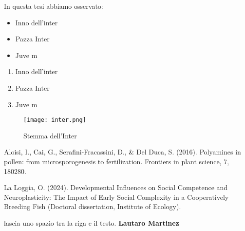\documentclass[12pt]{article} %
\begin{document}
In questa tesi abbiamo osservato:
\begin{itemize} %
    \item Inno dell'inter
    \item Pazza Inter
    \item Juve m
\end{itemize} %

\begin{enumerate} %
    \item Inno dell'inter
    \item Pazza Inter
    \item Juve m
\end{enumerate}

\newpage %


\begin{figure}
    \centering %
    \texttt{[image: inter.png]} %
    \caption{Stemma dell'Inter} %
    \label{fig:chagall} %
\end{figure}

\newpage
\begin{thebibliography}{999} %
    
    Aloisi, I., Cai, G., Serafini-Fracassini, D., \& Del Duca, S. (2016). Polyamines in pollen: from microsporogenesis to fertilization. Frontiers in plant science, 7, 180280. %
    
    La Loggia, O. (2024). Developmental Influences on Social Competence and Neuroplasticity: The Impact of Early Social Complexity in a Cooperatively Breeding Fish (Doctoral dissertation, Institute of Ecology).

\end{thebibliography}

\newpage

\hline %
\bigskip
lascia uno spazio tra la riga e il testo.
\textbf{Lautaro Martinez}
\bigskip
\hline %
\end{document}
